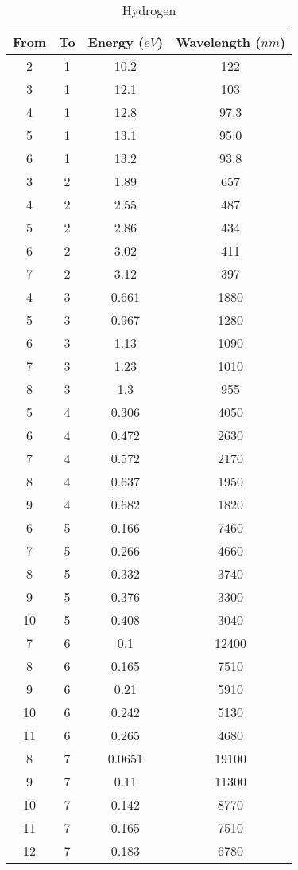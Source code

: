 \documentclass[paper=a4, fontsize=12pt]{scrartcl}
\begin{document}
\begin{table}[h]
\caption {Hydrogen}
\begin{center}
\begin{tabular}{| c | c | c | c |}
\hline
 From & To & Energy ($eV$) & Wavelength ($nm$)\\
 \hline
 2 & 1 & 10.2 & 122\\
 3 & 1 & 12.1 & 103\\
 4 & 1 & 12.8 & 97.3\\
 5 & 1 & 13.1 & 95.0\\
 6 & 1 & 13.2 & 93.8\\
 3 & 2 & 1.89 & 657\\
 4 & 2 & 2.55 & 487\\
 5 & 2 & 2.86 & 434\\
 6 & 2 & 3.02 & 411\\
 7 & 2 & 3.12 & 397\\
 4 & 3 & 0.661 & 1880\\
 5 & 3 & 0.967 & 1280\\
 6 & 3 & 1.13 & 1090\\
 7 & 3 & 1.23 & 1010\\
 8 & 3 & 1.3 & 955\\
 5 & 4 & 0.306 & 4050\\
 6 & 4 & 0.472 & 2630\\
 7 & 4 & 0.572 & 2170\\
 8 & 4 & 0.637 & 1950\\
 9 & 4 & 0.682 & 1820\\
 6 & 5 & 0.166 & 7460\\
 7 & 5 & 0.266 & 4660\\
 8 & 5 & 0.332 & 3740\\
 9 & 5 & 0.376 & 3300\\
 10 & 5 & 0.408 & 3040\\
 7 & 6 & 0.1 & 12400\\
 8 & 6 & 0.165 & 7510\\
 9 & 6 & 0.21 & 5910\\
 10 & 6 & 0.242 & 5130\\
 11 & 6 & 0.265 & 4680\\
 8 & 7 & 0.0651 & 19100\\
 9 & 7 & 0.11 & 11300\\
 10 & 7 & 0.142 & 8770\\
 11 & 7 & 0.165 & 7510\\
 12 & 7 & 0.183 & 6780\\
 \hline
\end{tabular}
\end{center}
\end{table}
\end{document}

